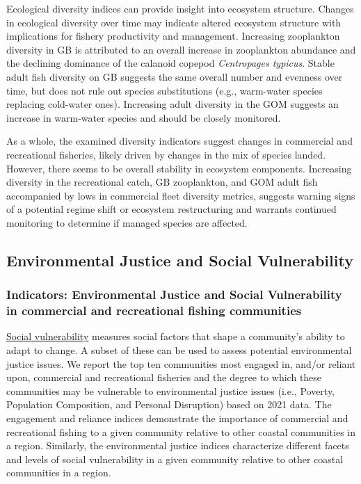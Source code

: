 \documentclass[
  10pt,
]{article}
\begin{document}
Ecological diversity indices can provide insight into ecosystem structure. Changes in ecological diversity over time may indicate altered ecosystem structure with implications for fishery productivity and management. Increasing zooplankton diversity in GB is attributed to an overall increase in zooplankton abundance and the declining dominance of the calanoid copepod \emph{Centropages typicus}. Stable adult fish diversity on GB suggests the same overall number and evenness over time, but does not rule out species substitutions (e.g., warm-water species replacing cold-water ones). Increasing adult diversity in the GOM suggests an increase in warm-water species and should be closely monitored.

As a whole, the examined diversity indicators suggest changes in commercial and recreational fisheries, likely driven by changes in the mix of species landed. However, there seems to be overall stability in ecosystem components. Increasing diversity in the recreational catch, GB zooplankton, and GOM adult fish accompanied by lows in commercial fleet diversity metrics, suggests warning signs of a potential regime shift or ecosystem restructuring and warrants continued monitoring to determine if managed species are affected.

\hypertarget{social-vulnerability}{%
\subsection{Environmental Justice and Social Vulnerability}\label{social-vulnerability}}

\hypertarget{indicators-environmental-justice-and-social-vulnerability-in-commercial-and-recreational-fishing-communities}{%
\subsubsection{Indicators: Environmental Justice and Social Vulnerability in commercial and recreational fishing communities}\label{indicators-environmental-justice-and-social-vulnerability-in-commercial-and-recreational-fishing-communities}}

\href{https://noaa-edab.github.io/catalog/engagement.html}{Social vulnerability} measures social factors that shape a community's ability to adapt to change. A subset of these can be used to assess potential environmental justice issues. We report the top ten communities most engaged in, and/or reliant upon, commercial and recreational fisheries and the degree to which these communities may be vulnerable to environmental justice issues (i.e., Poverty, Population Composition, and Personal Disruption) based on 2021 data. The engagement and reliance indices demonstrate the importance of commercial and recreational fishing to a given community relative to other coastal communities in a region. Similarly, the environmental justice indices characterize different facets and levels of social vulnerability in a given community relative to other coastal communities in a region.
\end{document}
